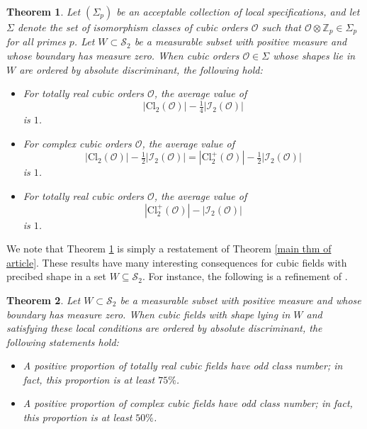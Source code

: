 \documentclass[table]{amsart}
\newtheorem{lthm}{Theorem}
\numberwithin{equation}{section}
\begin{document}
\begin{lthm}\label{thm b}
    Let $(\Sigma_p)$ be an acceptable collection of local specifications, and let
$\Sigma$ denote the set of isomorphism classes of cubic orders
$\mathcal{O}$ such that $\mathcal{O}\otimes\mathbb{Z}_p \in \Sigma_p$ for all
primes $p$. Let $W \subset \mathcal{S}_2$ be a measurable subset with positive measure and whose boundary has
measure zero. When cubic orders $\mathcal{O}\in\Sigma$ whose shapes
lie in $W$ are ordered by absolute discriminant, the following hold:
\begin{itemize}
\item[(a)] For totally real cubic orders $\mathcal{O}$, the average value of
\[
\left|\mathrm{Cl}_{2}(\mathcal{O})\right|
-\tfrac{1}{4}\left|\mathcal{I}_{2}(\mathcal{O})\right|
\]
is $1$.
\item[(b)] For complex cubic orders $\mathcal{O}$, the average value of
\[
\left|\mathrm{Cl}_{2}(\mathcal{O})\right|
-\tfrac{1}{2}\left|\mathcal{I}_{2}(\mathcal{O})\right|
=
\left|\mathrm{Cl}_{2}^{+}(\mathcal{O})\right|
-\tfrac{1}{2}\left|\mathcal{I}_{2}(\mathcal{O})\right|
\]
is $1$.
\item[(c)] For totally real cubic orders $\mathcal{O}$, the average value of
\[
\left|\mathrm{Cl}_{2}^{+}(\mathcal{O})\right|
-\left|\mathcal{I}_{2}(\mathcal{O})\right|
\]
is $1$.
\end{itemize}

\end{lthm}
\noindent We note that Theorem \ref{thm b} is simply a restatement of Theorem \ref{main thm of article}. These results have many interesting consequences for cubic fields with precibed shape in a set $W\subseteq \mathcal{S}_2$. For instance, the following is a refinement of \cite[Corollary 3]{bhargavaharron}.
\begin{lthm}\label{thm c}
    Let $W \subset \mathcal{S}_2$ be a measurable subset with positive measure and whose boundary has
measure zero. When cubic fields with shape lying in $W$ and satisfying these local conditions
are ordered by absolute discriminant, the following statements hold:
\begin{itemize}
\item[(1)] A positive proportion of totally real cubic fields have odd class
number; in fact, this proportion is at least $75\%$.
\item[(2)] A positive proportion of complex cubic fields have odd class number;
in fact, this proportion is at least $50\%$.
\end{itemize}
\end{lthm}
\end{document}

